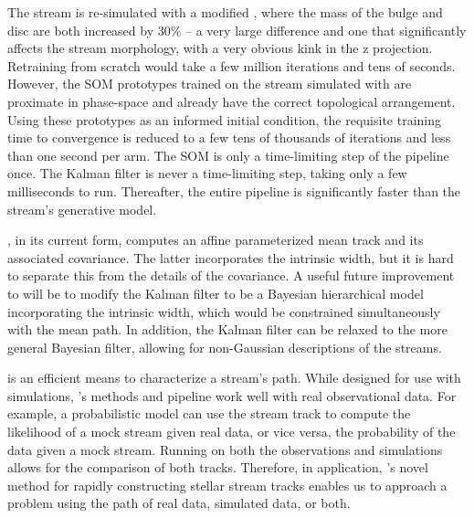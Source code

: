\documentclass[fleqn,usenatbib]{mnras}
\begin{document}
    The stream is re-simulated with a modified \galpyMWPotential, where the mass
    of the bulge and disc are both increased by 30\% -- a very large difference
    and one that significantly affects the stream morphology, with a very
    obvious kink in the z projection. Retraining from scratch would take a few
    million iterations and tens of seconds. However, the SOM prototypes trained
    on the stream simulated with \galpyMWPotential{} are proximate in
    phase-space and already have the correct topological arrangement. Using
    these prototypes as an informed initial condition, the requisite training
    time to convergence is reduced to a few tens of thousands of iterations and
    less than one second per arm. The SOM is only a time-limiting step of the
    \trackstream{} pipeline once. The Kalman filter is never a time-limiting
    step, taking only a few milliseconds to run. Thereafter, the entire pipeline
    is significantly faster than the stream's generative model.

    \trackstream{}, in its current form, computes an affine parameterized mean
    track and its associated covariance. The latter incorporates the intrinsic
    width, but it is hard to separate this from the details of the covariance. A
    useful future improvement to \trackstream{} will be to modify the Kalman
    filter to be a Bayesian hierarchical model incorporating the intrinsic
    width, which would be constrained simultaneously with the mean path. In
    addition, the Kalman filter can be relaxed to the more general Bayesian
    filter, allowing for non-Gaussian descriptions of the streams.

    \trackstream{} is an efficient means to characterize a stream's path. While
    designed for use with simulations, \trackstream{}'s methods and pipeline
    work well with real observational data. For example, a probabilistic model
    can use the stream track to compute the likelihood of a mock stream given
    real data, or vice versa, the probability of the data given a mock stream.
    Running \trackstream{} on both the observations and simulations allows for
    the comparison of both tracks. Therefore, in application, \trackstream's
    novel method for rapidly constructing stellar stream tracks enables us to
    approach a problem using the path of real data, simulated data, or both.



\end{document}

